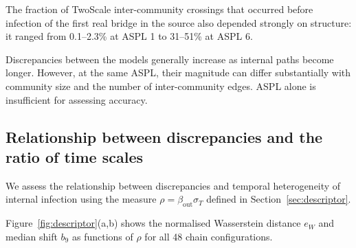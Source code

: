 \documentclass{ieeeaccess}
\newcommand{\TS}{\textup{TwoScale}}
\newcommand{\eW}{e_{W}}
\begin{document}
The fraction of \TS{} inter-community crossings that occurred before infection of the first real bridge in the source also depended strongly on structure: it ranged from 0.1--2.3\% at ASPL 1 to 31--51\% at ASPL 6.

Discrepancies between the models generally increase as internal paths become longer. However, at the same ASPL, their magnitude can differ substantially with community size and the number of inter-community edges. ASPL alone is insufficient for assessing accuracy.

\subsection{Relationship between discrepancies and the ratio of time scales}
\label{sec:res_descriptor}

We assess the relationship between discrepancies and temporal heterogeneity of internal infection using the measure $\rho=\beta_{\mathrm{out}}\sigma_T$ defined in Section~\ref{sec:descriptor}.

Figure~\ref{fig:descriptor}(a,b) shows the normalised Wasserstein distance $\eW$ and median shift $b_9$ as functions of $\rho$ for all 48 chain configurations.
\end{document}
